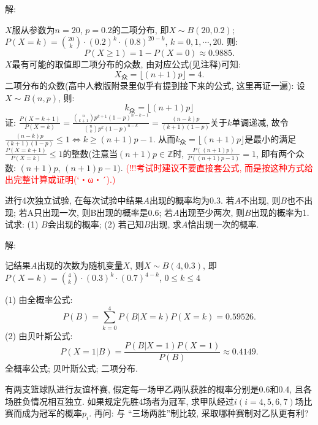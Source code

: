\documentclass[standard]{ExBook}
\renewenvironment{shaded}{%
  \def\FrameCommand{\fboxsep=\FrameSep \colorbox{shadecolor}}%
  \MakeFramed{\advance\hsize-\width \FrameRestore}%
}{%
  \endMakeFramed
}
\begin{document}
\begin{qitems}
解: 

$X$服从参数为$n=20$, $p=0.2$的二项分布, 即$X\sim B(20,0.2)$; $P(X=k)=\binom{20}{k}\cdot(0.2)^k\cdot(0.8)^{20-k}$, $k=0,1,\cdots,20$. 则:
$$P(X \geq 1)=1-P(X=0)\approx0.9885.$$
$X$最有可能的取值即二项分布的众数, 由对应公式\textcolor{themeColor}{(见注释)}可知:
$$X_{\text{众}}=\lfloor(n+1)p\rfloor=4.$$
\textcolor{themeColor}{\selectfont {} 二项分布的众数(高中人教版附录里似乎有提到接下来的公式, 这里再证一遍): 设$X\sim B(n,p)$, 则:
$$k_{\text{众}}=\lfloor(n+1)p\rfloor$$
证: $\displaystyle\frac{P(X=k+1)}{P(X=k)}=\frac{\binom{n}{k+1}p^{k+1}(1-p)^{n-k-1}}{\binom{n}{k}p^{k}(1-p)^{n-k}}=\frac{(n-k)p}{(k+1)(1-p)}$关于$k$单调递减, 故令$\displaystyle\frac{(n-k)p}{(k+1)(1-p)} \leq 1 \Longleftrightarrow k \geq (n+1)p-1$. 从而$k_{\text{众}}=\lfloor(n+1)p\rfloor$是最小的满足$\displaystyle\frac{P(X=k+1)}{P(X=k)} \leq 1$的整数(注意当$(n+1)p\in\mathbb{Z}$时, $\frac{P((n+1)p)}{P((n+1)p-1)}=1$, 即有两个众数: $(n+1)p$, $(n+1)p-1)$.} \textcolor{red}{(!!!考试时建议不要直接套公式, 而是按这种方式给出完整计算或证明(`・ω・´).)}

\vspace{2.5cm-5em}

    \begin{bbox}
    \begin{shaded}
        \qitem
进行4次独立试验, 在每次试验中结果$A$出现的概率均为0.3. 若$A$不出现, 则$B$也不出现; 若A只出现一次, 则B出现的概率是0.6; 若$A$出现至少两次, 则$B$出现的概率为1. 试求: (1) $B$会出现的概率; (2) 若己知$B$出现, 求$A$恰出现一次的概率.
    \end{shaded}
    \end{bbox}

\vspace{\dimexpr2.5cm-5em\relax}

解: 

记结果$A$出现的次数为随机变量$X$, 则$X\sim B(4,0.3)$, 即$P(X=k)=\binom{4}{k}\cdot(0.3)^k\cdot(0.7)^{4-k}$, $0 \leq k \leq 4$

(1) 由全概率公式:
$$P(B)=\sum\limits_{k=0}^{4}P(B|X=k)P(X=k)=0.59526.$$
(2) 由贝叶斯公式:
$$P(X=1|B)=\frac{P(B|X=1)P(X=1)}{P(B)}\approx0.4149.$$
\textcolor{themeColor}{\selectfont {} 全概率公式; 贝叶斯公式; 二项分布.}

\vspace{2.5cm-5em}

    \begin{bbox}
    \begin{shaded}
        \qitem
有两支篮球队进行友谊杯赛, 假定每一场甲乙两队获胜的概率分别是0.6和0.4, 且各场胜负情况相互独立. 如果规定先胜4场者为冠军, 求甲队经过$i(i=4,5,6,7)$场比赛而成为冠军的概率$p_{i}$. 再问: 与 ``三场两胜''制比较, 采取哪种赛制对乙队更有利?
    \end{shaded}
    \end{bbox}


\end{qitems}
\end{document}
